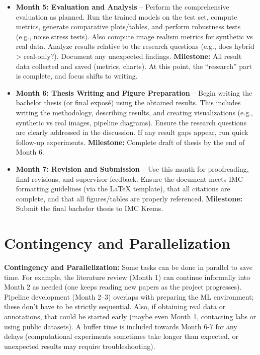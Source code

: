 \documentclass[
oneside,      %
openany       %
]{imc-inf}
\begin{document}
\begin{itemize}
		\item \textbf{Month 5: Evaluation and Analysis} – Perform the comprehensive evaluation as planned. Run the trained models on the test set, compute metrics, generate comparative plots/tables, and perform robustness tests (e.g., noise stress tests). Also compute image realism metrics for synthetic vs real data. Analyze results relative to the research questions (e.g., does hybrid > real-only?). Document any unexpected findings. \textbf{Milestone:} All result data collected and saved (metrics, charts). At this point, the “research” part is complete, and focus shifts to writing.
		
		\item \textbf{Month 6: Thesis Writing and Figure Preparation} – Begin writing the bachelor thesis (or final exposé) using the obtained results. This includes writing the methodology, describing results, and creating visualizations (e.g., synthetic vs real images, pipeline diagrams). Ensure the research questions are clearly addressed in the discussion. If any result gaps appear, run quick follow-up experiments. \textbf{Milestone:} Complete draft of thesis by the end of Month 6.
		
		\item \textbf{Month 7: Revision and Submission} – Use this month for proofreading, final revisions, and supervisor feedback. Ensure the document meets IMC formatting guidelines (via the LaTeX template), that all citations are complete, and that all figures/tables are properly referenced. \textbf{Milestone:} Submit the final bachelor thesis to IMC Krems.
	\end{itemize}
	
	
	\section{Contingency and Parallelization}
	\textbf{Contingency and Parallelization:} Some tasks can be done in parallel to save time. For example, the literature review (Month 1) can continue informally into Month 2 as needed (one keeps reading new papers as the project progresses). Pipeline development (Month 2–3) overlaps with preparing the ML environment; these don’t have to be strictly sequential. Also, if obtaining real data or annotations, that could be started early (maybe even Month 1, contacting labs or using public datasets). A buffer time is included towards Month 6-7 for any delays (computational experiments sometimes take longer than expected, or unexpected results may require troubleshooting).
	
\end{document}
